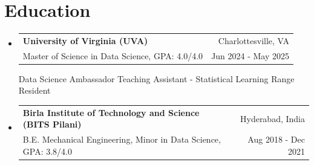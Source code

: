 \documentclass[letterpaper,11pt]{article}
\makeatletter
\newcommand{\resumeSubheading}[4]{
  \item
    \begin{tabular*}{1\textwidth}{l@{\extracolsep{\fill}}r}
      \textbf{\large{#1}} & {\small{#2}} \\
      {{{#3}}} & {{\small{#4}}}
    \end{tabular*}
  \vspace{-0.4cm}
}
\newcommand{\resumeSubHeadingListStart}{\begin{itemize}[leftmargin=0.0in, label={}]}
\newcommand{\resumeSubHeadingListEnd}{\end{itemize}}
\makeatother
\begin{document}
\section{Education}
\resumeSubHeadingListStart
\resumeSubheading
    {University of Virginia {(UVA)}}
    {Charlottesville, VA}
    {Master of Science in Data Science, GPA: 4.0/4.0}
    {Jun 2024 - May 2025}

    \vspace{3pt}
    \footnotesize{
    Data Science Ambassador {\textbullet}
    Teaching Assistant - Statistical Learning {\textbullet}
    Range Resident
    }

    \vspace{3pt}
    


\resumeSubheading
    {Birla Institute of Technology and Science \normalsize{(BITS Pilani)}}
    {Hyderabad, India}
    {B.E. Mechanical Engineering, Minor in Data Science, GPA: 3.8/4.0}
    {Aug 2018 - Dec 2021}
\resumeSubHeadingListEnd






\end{document}
